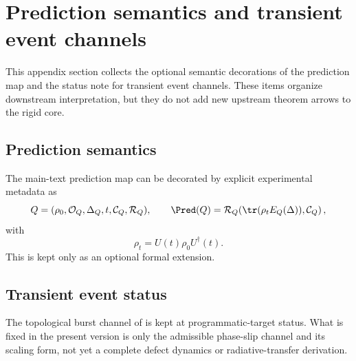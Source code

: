 \section{Prediction semantics and transient event channels}
\label{app:prediction-semantics}

This appendix section collects the optional semantic decorations of the prediction map and the
status note for transient event channels. These items organize downstream interpretation, but they
do not add new upstream theorem arrows to the rigid core.

\subsection{Prediction semantics}

The main-text prediction map can be decorated by explicit experimental metadata as
\[
Q=(\rho_0,\mathcal O_Q,\Delta_Q,t,\mathcal C_Q,\mathcal R_Q),
\qquad
\Pred(Q)=\mathcal R_Q\!\left(\tr(\rho_tE_Q(\Delta)),\mathcal C_Q\right),
\]
with
\[
\rho_t=U(t)\rho_0U^\dagger(t).
\]
This is kept only as an optional formal extension.

\subsection{Transient event status}

The topological burst channel of  is kept at
programmatic-target status. What is fixed in the present version is only the admissible phase-slip
channel and its scaling form, not yet a complete defect dynamics or radiative-transfer derivation.

